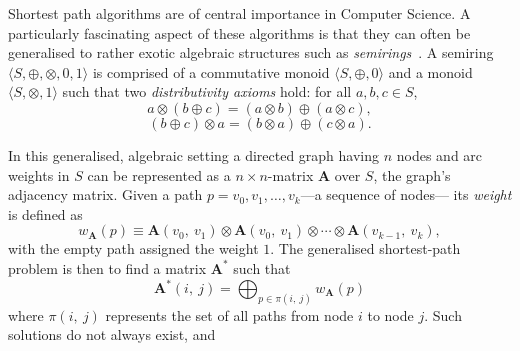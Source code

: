 Shortest path algorithms are of central importance in Computer Science.
A particularly fascinating aspect of these algorithms is
that they can often be generalised to rather exotic algebraic structures
such as \emph{semirings}~\cite{gondran_graphs_2008}.
A semiring $\langle S, \oplus, \otimes, 0, 1 \rangle$ is
comprised of a commutative monoid $\langle S, \oplus, 0\rangle$
and a monoid $\langle S, \otimes, 1\rangle$ such that
two \emph{distributivity axioms} hold:
for all $a, b, c \in S$,
\begin{equation}
\label{eq:left:distributivity}
    a\otimes (b \oplus c) = (a\otimes b) \oplus (a\otimes c),
\end{equation}
\begin{equation}
\label{eq:right:distributivity}
    (b \oplus c) \otimes a = (b\otimes a) \oplus (c\otimes a).
\end{equation}

In this generalised, algebraic setting a directed graph having $n$ nodes and arc weights in $S$
can be represented as a $n\times n$-matrix $\mathbf{A}$ over $S$, the graph's
adjacency matrix.
Given a path $p = v_0, v_1, \ldots, v_k$---a sequence of nodes--- its \emph{weight}
is defined as
\begin{equation}
\label{eq:def:weight}
    w_{\mathbf{A}}(p)
    \equiv
    \mathbf{A}(v_0,\ v_1)
    \otimes \mathbf{A}(v_0,\ v_1)
    \otimes \cdots
    \otimes \mathbf{A}(v_{k-1},\ v_k),
\end{equation}
with the empty path assigned the weight $1$.
The generalised shortest-path problem is then to find
a matrix $\mathbf{A}^*$ such that
\begin{equation}
\label{eq:global}
\mathbf{A}^*(i,\ j) = \displaystyle\bigoplus_{p \in \pi(i,\ j)} w_{\mathbf{A}}(p)
\end{equation}
where $\pi(i,\ j)$ represents the set of all paths from node $i$ to node $j$.
Such solutions do not always exist, and 

